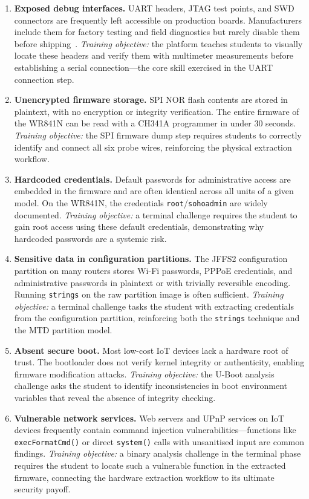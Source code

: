 \begin{enumerate}
    \item \textbf{Exposed debug interfaces.} UART headers, JTAG test points, and SWD connectors are frequently left accessible on production boards. Manufacturers include them for factory testing and field diagnostics but rarely disable them before shipping~\cite{shwartz2017}. \emph{Training objective:} the platform teaches students to visually locate these headers and verify them with multimeter measurements before establishing a serial connection---the core skill exercised in the UART connection step.

    \item \textbf{Unencrypted firmware storage.} SPI NOR flash contents are stored in plaintext, with no encryption or integrity verification. The entire firmware of the WR841N can be read with a CH341A programmer in under 30 seconds. \emph{Training objective:} the SPI firmware dump step requires students to correctly identify and connect all six probe wires, reinforcing the physical extraction workflow.

    \item \textbf{Hardcoded credentials.} Default passwords for administrative access are embedded in the firmware and are often identical across all units of a given model. On the WR841N, the credentials \texttt{root}/\texttt{sohoadmin} are widely documented. \emph{Training objective:} a terminal challenge requires the student to gain root access using these default credentials, demonstrating why hardcoded passwords are a systemic risk.

    \item \textbf{Sensitive data in configuration partitions.} The JFFS2 configuration partition on many routers stores Wi-Fi passwords, PPPoE credentials, and administrative passwords in plaintext or with trivially reversible encoding. Running \texttt{strings} on the raw partition image is often sufficient. \emph{Training objective:} a terminal challenge tasks the student with extracting credentials from the configuration partition, reinforcing both the \texttt{strings} technique and the MTD partition model.

    \item \textbf{Absent secure boot.} Most low-cost IoT devices lack a hardware root of trust. The bootloader does not verify kernel integrity or authenticity, enabling firmware modification attacks. \emph{Training objective:} the U-Boot analysis challenge asks the student to identify inconsistencies in boot environment variables that reveal the absence of integrity checking.

    \item \textbf{Vulnerable network services.} Web servers and UPnP services on IoT devices frequently contain command injection vulnerabilities---functions like \texttt{execFormatCmd()} or direct \texttt{system()} calls with unsanitised input are common findings. \emph{Training objective:} a binary analysis challenge in the terminal phase requires the student to locate such a vulnerable function in the extracted firmware, connecting the hardware extraction workflow to its ultimate security payoff.
\end{enumerate}

